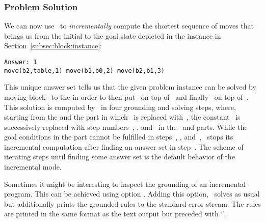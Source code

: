 \subsubsection{Problem Solution}\label{subsec:block:solution}

We can now use \clingo\ to \emph{incrementally} compute the shortest
sequence of moves that brings us from the initial to the goal state
depicted in the instance in Section~\ref{subsec:block:instance}:%
%
\begin{lstlisting}[numbers=none]
Answer: 1
move(b2,table,1) move(b1,b0,2) move(b2,b1,3)
\end{lstlisting}
%
This unique answer set tells us
that the given problem instance can be solved by moving block~ to the 
in order to then put~ on top of~ and finally~ on top of~.
This solution is computed by \clingo\ in four grounding and solving steps,
where, starting from the  and the  part in which~ is replaced with~, 
the constant~ is successively replaced with step numbers~, , and~ in the~ and  parts.
While the goal conditions in the  part cannot be fulfilled in steps~, , and~,
\clingo\ stops its incremental computation after finding an answer set in step~.
The scheme of iterating steps until finding some answer set is the default behavior of the incremental mode.

Sometimes it might be interesting to inspect the grounding of an incremental program.
This can be achieved using option .
Adding this option, \clingo\ solves as usual
but additionally prints the grounded rules to the standard error stream.
The rules are printed in the same format as the text output but preceded with `\code{\%}'.

